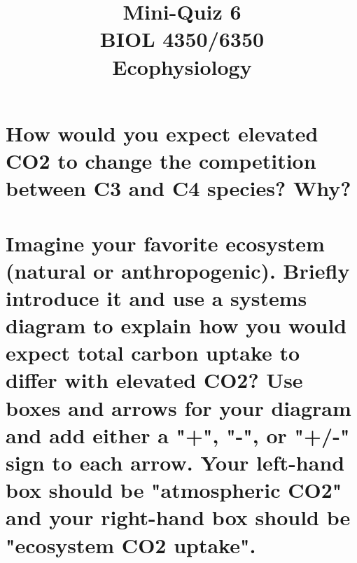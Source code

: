 \documentclass[12pt, notitlepage]{article}   	%
\title{
	\textbf{
		Mini-Quiz 6
	} \\
	\large BIOL 4350/6350 \\
	\large Ecophysiology \\
}
\date{\vspace{-5ex}}
\def\wl{\par \vspace{\baselineskip}}
\begin{document}
{\selectfont %

\maketitle

\section{\small{How would you expect elevated CO2 to change the competition between C3 
and C4 species? Why?}}

\newpage

\section{\small{Imagine your favorite ecosystem (natural or anthropogenic). 
Briefly introduce it and use a systems diagram to explain how you would expect total carbon uptake
to differ with elevated CO2? Use boxes and arrows for your diagram and add either a "+", "-", or "+/-"
sign to each arrow. Your left-hand box should be "atmospheric CO2" and your right-hand box should
be "ecosystem CO2 uptake".}}

\wl
\wl
\wl
\wl
\wl
\wl
\wl
\wl
\wl
\wl
\wl
\wl
\wl
\wl


} %
\end{document}
